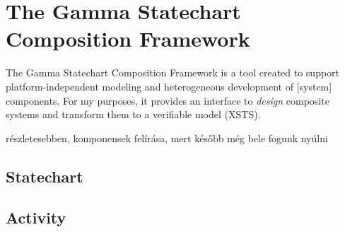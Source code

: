 \section{The Gamma Statechart Composition Framework}

The Gamma Statechart Composition Framework is a tool created to support platform-independent modeling and heterogeneous development of [system] components. For my purposes, it provides an interface to \emph{design} composite systems and transform them to a verifiable model (XSTS).


részletesebben, komponensek felírása, mert később még bele fogunk nyúlni

\subsection{Statechart}

\subsection{Activity}
